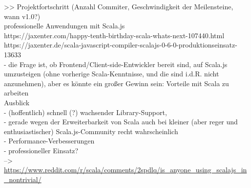 \documentclass[a4paper, 12pt, hidelinks, listof=totoc, listoftables=totoc, bibliography=totoc]{scrreprt}
\begin{document}
	>> Projektfortschritt (Anzahl Commiter, Geschwindigkeit der Meilensteine, wann v1.0?) \\


professionelle Anwendungen mit Scala.js \\

		https://jaxenter.com/happy-tenth-birthday-scala-whats-next-107440.html \\
	https://jaxenter.de/scala-javascript-compiler-scalajs-0-6-0-produktionseinsatz-13633 \\
	- die Frage ist, ob Frontend/Client-side-Entwickler bereit sind, auf Scala.js umzusteigen (ohne vorherige Scala-Kenntnisse, und die sind i.d.R. nicht anzunehmen), aber es könnte ein großer Gewinn sein: Vorteile mit Scala zu arbeiten\cite{doeraene2013.CSJ} \\




Ausblick \\
  - (hoffentlich) schnell (?) wachsender Library-Support,  \\
     	- gerade wegen der Erweiterbarkeit von Scala auch bei kleiner (aber reger und enthusiastischer) Scala.js-Community  recht wahrscheinlich \\
  - Performance-Verbesserungen \\
  - professioneller Einsatz? \\
    -->  \url{https://www.reddit.com/r/scala/comments/2spdlq/is_anyone_using_scalajs_in_nontrivial/} \\






%
%
%
%
\end{document}
